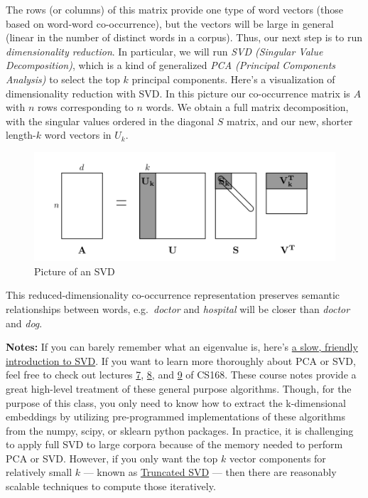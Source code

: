 \documentclass[11pt]{article}
\begin{document}
The rows (or columns) of this matrix provide one type of word vectors
(those based on word-word co-occurrence), but the vectors will be large
in general (linear in the number of distinct words in a corpus). Thus,
our next step is to run \emph{dimensionality reduction}. In particular,
we will run \emph{SVD (Singular Value Decomposition)}, which is a kind
of generalized \emph{PCA (Principal Components Analysis)} to select the
top \(k\) principal components. Here's a visualization of dimensionality
reduction with SVD. In this picture our co-occurrence matrix is \(A\)
with \(n\) rows corresponding to \(n\) words. We obtain a full matrix
decomposition, with the singular values ordered in the diagonal \(S\)
matrix, and our new, shorter length-\(k\) word vectors in \(U_k\).

\begin{figure}
\centering
\includegraphics{./imgs/svd.png}
\caption{Picture of an SVD}
\end{figure}

This reduced-dimensionality co-occurrence representation preserves
semantic relationships between words, e.g.~\emph{doctor} and
\emph{hospital} will be closer than \emph{doctor} and \emph{dog}.

\textbf{Notes:} If you can barely remember what an eigenvalue is, here's
\href{https://davetang.org/file/Singular_Value_Decomposition_Tutorial.pdf}{a
slow, friendly introduction to SVD}. If you want to learn more
thoroughly about PCA or SVD, feel free to check out lectures
\href{https://web.stanford.edu/class/cs168/l/l7.pdf}{7},
\href{http://theory.stanford.edu/~tim/s15/l/l8.pdf}{8}, and
\href{https://web.stanford.edu/class/cs168/l/l9.pdf}{9} of CS168. These
course notes provide a great high-level treatment of these general
purpose algorithms. Though, for the purpose of this class, you only need
to know how to extract the k-dimensional embeddings by utilizing
pre-programmed implementations of these algorithms from the numpy,
scipy, or sklearn python packages. In practice, it is challenging to
apply full SVD to large corpora because of the memory needed to perform
PCA or SVD. However, if you only want the top \(k\) vector components
for relatively small \(k\) --- known as
\href{https://en.wikipedia.org/wiki/Singular_value_decomposition\#Truncated_SVD}{Truncated
SVD} --- then there are reasonably scalable techniques to compute those
iteratively.
\end{document}
